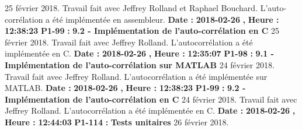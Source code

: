 \documentclass{article}%
\begin{document}
%
25 février 2018.\newline%
Travail fait avec Jeffrey Rolland et Raphael Bouchard.\newline%
L'auto{-}corrélation a été implémentée en assembleur.\newline%
\newline%
%
\textbf{Date : }%
\textbf{2018{-}02{-}26}%
\textbf{,}%
\textbf{ Heure : }%
\textbf{12:38:23}%
\newline%
%
\textbf{P1{-}99 }%
\textbf{ : }%
\textbf{ 9.2 {-} Implémentation de l'auto{-}corrélation en C}%
\newline%
\newline%
%
25 février 2018.\newline%
Travail fait avec Jeffrey Rolland.\newline%
L'autocorrélation a été implémentée en C.\newline%
\newline%
%
\textbf{Date : }%
\textbf{2018{-}02{-}26}%
\textbf{,}%
\textbf{ Heure : }%
\textbf{12:35:07}%
\newline%
%
\textbf{P1{-}98 }%
\textbf{ : }%
\textbf{ 9.1 {-} Implémentation de l'auto{-}corrélation sur MATLAB}%
\newline%
\newline%
%
24 février 2018.\newline%
Travail fait avec Jeffrey Rolland.\newline%
L'autocorrélation a été implémentée sur MATLAB.\newline%
\newline%
%
\textbf{Date : }%
\textbf{2018{-}02{-}26}%
\textbf{,}%
\textbf{ Heure : }%
\textbf{12:38:23}%
\newline%
%
\textbf{P1{-}99 }%
\textbf{ : }%
\textbf{ 9.2 {-} Implémentation de l'auto{-}corrélation en C}%
\newline%
\newline%
%
24 février 2018.\newline%
Travail fait avec Jeffrey Rolland.\newline%
L'autocorrélation a été implémentée en C.\newline%
\newline%
%
\textbf{Date : }%
\textbf{2018{-}02{-}26}%
\textbf{,}%
\textbf{ Heure : }%
\textbf{12:44:03}%
\newline%
%
\textbf{P1{-}114 }%
\textbf{ : }%
\textbf{ Tests unitaires}%
\newline%
\newline%
%
26 février 2018.\newline%
\end{document}

